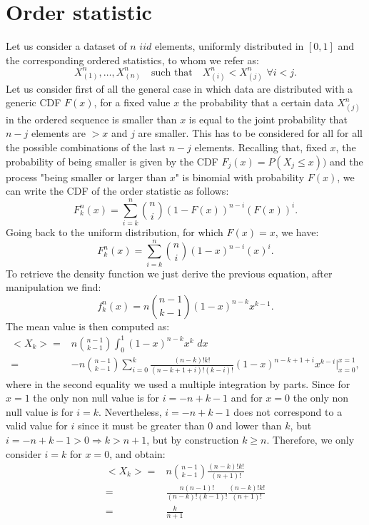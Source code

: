\documentclass[twoside,onecolumn]{article}
\theoremstyle{definition}
\begin{document}
\section{Order statistic}
Let us consider a dataset of $n$ $iid$ elements, uniformly distributed in $[0,1]$ and the corresponding ordered statistics, to whom we refer as:
\begin{equation}
X_{(1)}^n, \dots, X_{(n)}^n \quad \text{such that} \quad X_{(i)}^n< X_{(j)}^n\,\, \forall i<j.
\end{equation}
Let us consider first of all the general case in which data are distributed with a generic CDF $F(x)$, for a fixed value $x$ the probability that a certain data $X_{(j)}^n$ in the ordered sequence is smaller than $x$ is equal to the joint probability that $n- j$ elements are $> x$ and  $j$ are smaller. This has to be considered for all  for all the possible combinations of  the last $n - j$ elements. Recalling that, fixed $x$, the probability of being smaller is given by the CDF $F_j(x)= P(X_j\leq x))$ and the process "being smaller or larger than $x$" is binomial with probability $F(x)$, we can write the CDF of the order statistic as follows:
\begin{equation}
F_k^n (x)=\sum_{i=k}^{n}\binom{n}{i}(1-F(x))^{n-i}(F(x))^i.
\end{equation}
Going back to the uniform distribution, for which $F(x)=x$, we have:
\begin{equation}
F_k^n (x)=\sum_{i=k}^{n}\binom{n}{i}(1-x)^{n-i}(x)^i.
\end{equation}
To retrieve the density function we just derive the previous equation, after manipulation we find:
\begin{equation}
f_k^n(x)= n\binom{n-1}{k-1}(1-x)^{n-k}x^{k-1}.
\end{equation}
The mean value is then computed as:
\begin{equation}\begin{split}
<X_{k}>=& n\binom{n-1}{k-1} \int_0^1(1-x)^{n-k}x^{k} \,\, dx \\
=& - n\binom{n-1}{k-1} \sum_{i=0}^k \frac{(n-k)! k!}{(n-k+1+i)! (k-i)!}(1-x)^{n-k+1+i}x^{k-i}\Big|_{x=0}^{x=1},
\end{split}\end{equation}
where in the second equality we used a multiple integration by parts. Since for $x=1$ the only non null value is for $i=-n+k-1$ and for $x=0$ the only non null value is for $i=k$. Nevertheless, $i=-n+k-1$ does not correspond to a valid value for $i$ since it must be greater than 0 and lower than $k$, but  $i=-n+k-1>0 \Rightarrow k>n+1$, but by construction $k\geq n$. Therefore, we only consider $i=k$ for $x=0$, and obtain:
\begin{equation}\begin{split}
<X_{k}>=&n\binom{n-1}{k-1}  \frac{(n-k)! k!}{(n+1)! }\\
=&\frac{n(n-1)! }{(n-k)! (k-1)!} \frac{(n-k)! k!}{(n+1)! }\\
=& \frac{k}{n+1}
\end{split}\end{equation}
\end{document}
